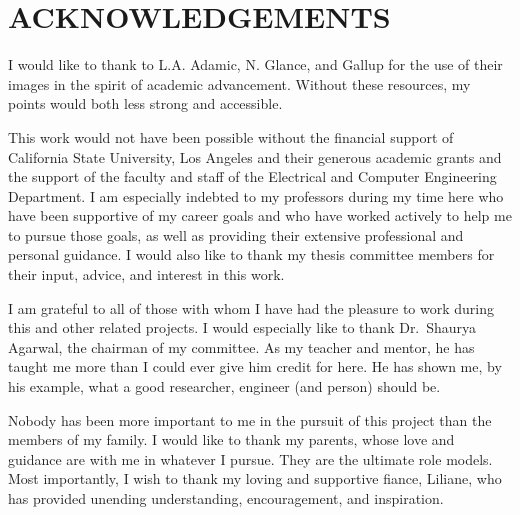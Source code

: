 \chapter*{ACKNOWLEDGEMENTS}

I would like to thank to L.A. Adamic, N. Glance, and Gallup for the use of their images in the spirit of academic advancement. Without these resources, my points would both less strong and accessible.

This work would	not	have been possible without the financial support of	California State University, Los Angeles and their generous academic grants and the support of the faculty and staff of the Electrical and Computer Engineering Department. I am especially indebted	to my professors during my time here who have been supportive	of my career goals and who have worked actively to help me to pursue those goals, as well as providing their extensive professional and personal guidance. I would also like to thank my thesis committee members for their input, advice, and interest in this work. 

I am grateful to all of	those with whom I have had the pleasure to work during this	and	other related projects.	I would especially like to thank Dr.~Shaurya Agarwal, the	chairman of	my committee. As my	teacher	and	mentor,	he has taught me more than I could ever give him credit for here. He has shown me, by his example, what a	good researcher, engineer (and person) should be.

Nobody has been	more important to me in	the	pursuit	of this	project	than the members	of	my	family.	I would	like to	thank	my	parents, whose love	and	guidance are with me in	whatever I pursue. They	are	the ultimate role models.	Most importantly, I wish to	thank my loving	and	supportive fiance, Liliane, who has	provided unending understanding, encouragement, and inspiration.
